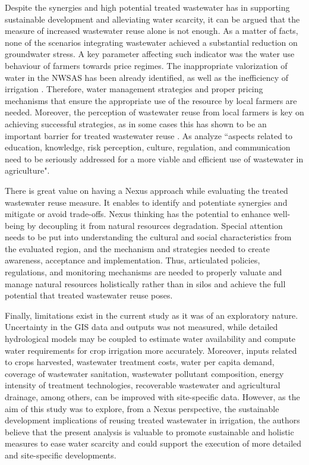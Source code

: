 Despite the synergies and high potential treated wastewater has in supporting sustainable development and alleviating water scarcity, it can be argued that the measure of increased wastewater reuse alone is not enough. As a matter of facts, none of the scenarios integrating wastewater achieved a substantial reduction on groundwater stress. A key parameter affecting such indicator was the water use behaviour of farmers towards price regimes. The inappropriate valorization of water in the NWSAS has been already identified, as well as the inefficiency of irrigation \cite{BetterValorizationIrrigation2015}. Therefore, water management strategies and proper pricing mechanisms that ensure the appropriate use of the resource by local farmers are needed. Moreover, the perception of wastewater reuse from local farmers is key on achieving successful strategies, as in some cases this has shown to be an important barrier for treated wastewater reuse \cite{mahjoubPublicAcceptanceWastewater2018}. As \citet{mahjoubPublicAcceptanceWastewater2018} analyze ``aspects related to education, knowledge, risk perception, culture, regulation, and communication need to be seriously addressed for a more viable and efficient use of wastewater in agriculture".

There is great value on having a Nexus approach while evaluating the treated wastewater reuse measure. It enables to identify and potentiate synergies and mitigate or avoid trade-offs. Nexus thinking has the potential to enhance well-being by decoupling it from natural resources degradation. Special attention needs to be put into understanding the cultural and social characteristics from the evaluated region, and the mechanism and strategies needed to create awareness, acceptance and implementation. Thus, articulated policies, regulations, and monitoring mechanisms are needed to properly valuate and manage natural resources holistically rather than in silos and achieve the full potential that treated wastewater reuse poses.

Finally, limitations exist in the current study as it was of an exploratory nature. Uncertainty in the GIS data and outputs was not measured, while detailed hydrological models may be coupled to estimate water availability and compute water requirements for crop irrigation more accurately. Moreover, inputs related to crops harvested, wastewater treatment costs, water per capita demand, coverage of wastewater sanitation, wastewater pollutant composition, energy intensity of treatment technologies, recoverable wastewater and agricultural drainage, among others, can be improved with site-specific data. However, as the aim of this study was to explore, from a Nexus perspective, the  sustainable development implications of reusing treated wastewater in irrigation, the authors believe that the present analysis is valuable to promote sustainable and holistic measures to ease water scarcity and could support the execution of more detailed and site-specific developments.